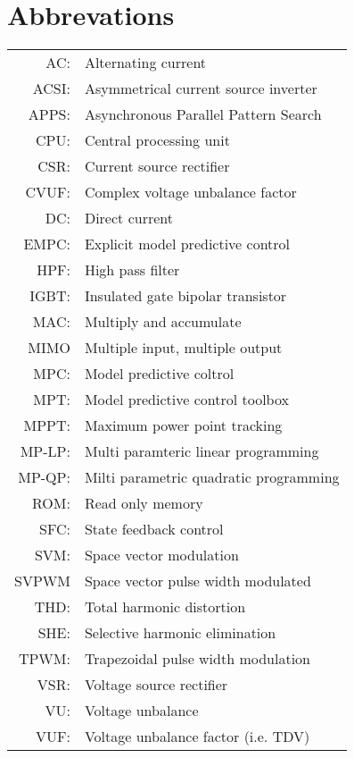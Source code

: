 \newpage
\section{Abbrevations}
\begin{longtable}{r l}
AC:				& Alternating current\\
ACSI:			& Asymmetrical current source inverter\\
APPS:			& Asynchronous Parallel Pattern Search\\

CPU:            & Central processing unit\\
CSR:      & Current source rectifier \\
CVUF:			& Complex voltage unbalance factor\\
DC:				& Direct current\\
EMPC:     & Explicit model predictive control\\


HPF:      & High pass filter\\
IGBT:     & Insulated gate bipolar transistor\\



MAC:        & Multiply and accumulate\\
MIMO			& Multiple input, multiple output\\
MPC:      & Model predictive coltrol\\
MPT:      & Model predictive control toolbox\\ 
MPPT:     & Maximum power point tracking\\
MP-LP:      & Multi paramteric linear programming\\
MP-QP:      & Milti parametric quadratic programming\\




ROM:        & Read only memory\\
SFC:      & State feedback control\\
SVM:			& Space vector modulation\\
SVPWM     & Space vector pulse width modulated\\
THD:      & Total harmonic distortion\\
SHE:			& Selective harmonic elimination\\	
TPWM:			& Trapezoidal pulse width modulation\\

VSR:      & Voltage source rectifier \\
VU:          &Voltage unbalance\\
VUF:      & Voltage unbalance factor (i.e. TDV)\\





\end{longtable} 